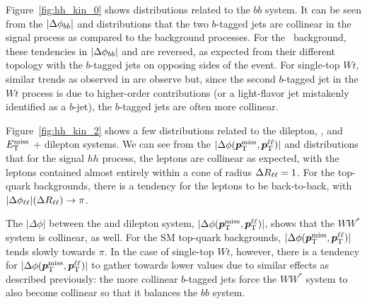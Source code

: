 Figure~\ref{fig:hh_kin_0} shows distributions related to the $bb$ system.
It can be seen from the $|\Delta \phi_{bb}|$ and \drbb distributions that the two $b$-tagged jets
are collinear in the signal process as compared to the background processes.
For the \ttbar~background, these tendencies in $|\Delta \phi_{bb}|$ and \drbb are reversed,
as expected from their different topology with the $b$-tagged jets on opposing sides of the event.
For single-top $Wt$, similar trends as observed in \ttbar are observe but, since the second $b$-tagged
jet in the $Wt$ process is due to higher-order contributions (or a light-flavor jet mistakenly identified as a $b$-jet),
the $b$-tagged jets are often more collinear.


Figure~\ref{fig:hh_kin_2} shows a few distributions related to the dilepton, \met, and $E_{\text{T}}^{\text{miss}}$ + dilepton systems.
We can see from the $|\Delta \phi (\bm{p}_{\text{T}}^{\text{miss}}, \bm{p}_{\text{T}}^{\ell\ell})|$ and \drll distributions that for the signal $hh$ process, the leptons
are collinear as expected, with the leptons contained almost entirely within a cone of radius $\Delta R_{\ell\ell} = 1$.
For the top-quark backgrounds, there is a tendency for the leptons to be back-to-back, with $|\Delta \phi_{\ell\ell}| (\Delta R_{\ell\ell}) \rightarrow \pi$.

The $|\Delta \phi|$ between the \met and dilepton system, $|\Delta \phi (\bm{p}_{\text{T}}^{\text{miss}}, \bm{p}_{\text{T}}^{\ell\ell})|$, shows that the $WW^*$ system is collinear, as well.
For the SM top-quark backgrounds, $|\Delta \phi (\bm{p}_{\text{T}}^{\text{miss}}, \bm{p}_{\text{T}}^{\ell\ell})|$ tends slowly towards $\pi$.
In the case of single-top $Wt$, however, there is a tendency for $|\Delta \phi (\bm{p}_{\text{T}}^{\text{miss}}, \bm{p}_{\text{T}}^{\ell\ell})|$ to gather towards lower values due
to similar effects as described previously: the more collinear $b$-tagged jets force the
$WW^*$ system to also become collinear so that it balances the $bb$ system.

